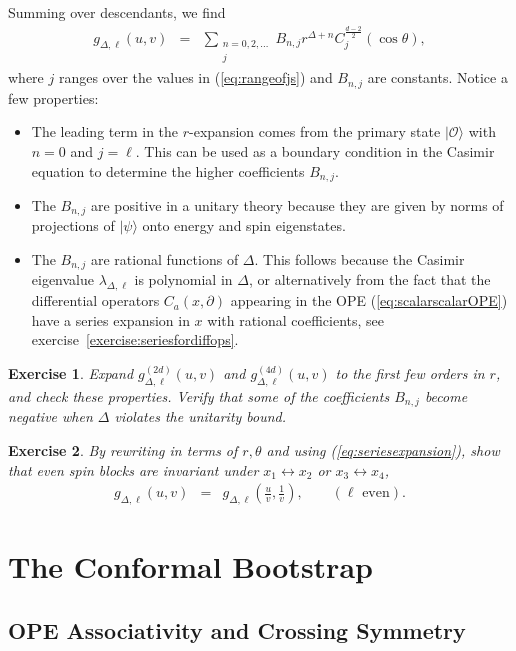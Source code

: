 \documentclass{ws-rv9x6}
\newcommand\be{\begin{eqnarray}}
\newcommand\ee{\end{eqnarray}}
\newcommand\cO{\mathcal{O}}
\newcommand\p[1]{\left(#1\right)}
\newcommand\ptl\partial
\newcommand\<\langle
\renewcommand\>\rangle
\renewcommand\.{\cdot}
\newcommand\De{\Delta}
\renewcommand\l\lambda
\renewcommand\th{\theta}
\newtheorem{exercise}{Exercise}[section]
\begin{document}
Summing over descendants, we find
\be
\label{eq:seriesexpansion}
g_{\De,\ell}(u,v) &=& \sum_{\substack{n=0,2,\dots \\ j}} B_{n,j}r^{\De+n}C_j^{\frac{d-2}{2}}(\cos\th),\label{eq:seriesforblock}
\ee
where $j$ ranges over the values in (\ref{eq:rangeofjs}) and $B_{n,j}$ are constants.  
Notice a few properties:
\begin{itemize}
\item The leading term in the $r$-expansion comes from the primary state $|\cO\>$ with $n=0$ and $j=\ell$. This can be used as a boundary condition in the Casimir equation to determine the higher coefficients $B_{n,j}$.
\item The $B_{n,j}$ are positive in a unitary theory because they are given by norms of projections of $|\psi\>$ onto energy and spin eigenstates.
\item The $B_{n,j}$ are rational functions of $\De$.  This follows because the Casimir eigenvalue $\l_{\De,\ell}$ is polynomial in $\De$, or alternatively from the fact that the differential operators $C_a(x,\ptl)$ appearing in the OPE (\ref{eq:scalarscalarOPE}) have a series expansion in $x$ with rational coefficients, see exercise~\ref{exercise:seriesfordiffops}. 
\end{itemize}

\begin{exercise}
Expand $g^{(2d)}_{\De,\ell}(u,v)$ and $g^{(4d)}_{\De,\ell}(u,v)$ to the first few orders in $r$, and check these properties.  Verify that some of the coefficients $B_{n,j}$ become negative when $\De$ violates the unitarity bound.
\end{exercise}

\begin{exercise}
By rewriting in terms of $r,\th$ and using (\ref{eq:seriesexpansion}), show that even spin blocks are invariant under $x_1\leftrightarrow x_2$ or $x_3\leftrightarrow x_4$,
\be
\label{eq:invariantunderonetwo}
g_{\De,\ell}(u,v) &=& g_{\De,\ell}\p{\frac{u}{v},\frac 1 v},\qquad(\textrm{$\ell$ even}).
\ee
\end{exercise}

\section{The Conformal Bootstrap}

\subsection{OPE Associativity and Crossing Symmetry}
\end{document}
